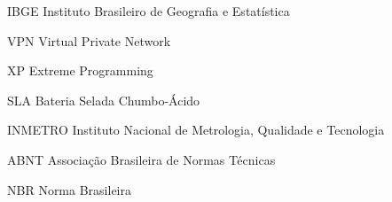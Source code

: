 \begin{siglas}
  \item[IBGE] Instituto Brasileiro de Geografia e Estatística
  \item[VPN] Virtual Private Network
  \item [XP] Extreme Programming
  \item [SLA] Bateria Selada Chumbo-Ácido
  \item [INMETRO] Instituto Nacional de Metrologia, Qualidade e Tecnologia
  \item [ABNT] Associação Brasileira de Normas Técnicas
  \item [NBR] Norma Brasileira
\end{siglas}
